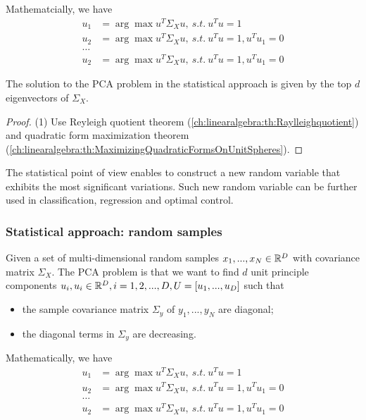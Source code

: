 \begin{refsection}
\begin{definition}
Mathematcially, we have
\begin{align*}
    u_1 &= \arg \max u^T\Sigma_X u, ~s.t.~  u^Tu = 1  \\
    u_2 &= \arg \max u^T\Sigma_X u, ~s.t.~ u^Tu=1, u^Tu_1 = 0\\
    \dots &  \\
    u_2 &= \arg \max u^T\Sigma_X u, ~s.t.~ u^Tu=1, u^Tu_1 = 0
\end{align*}
\end{definition}

\begin{theorem}
The solution to the PCA problem in the statistical approach is given by the top $d$ eigenvectors of $\Sigma_X$.
\end{theorem}
\begin{proof}
(1) Use Reyleigh quotient theorem (\autoref{ch:linearalgebra:th:Raylleighquotient}) and quadratic form maximization theorem (\autoref{ch:linearalgebra:th:MaximizingQuadraticFormsOnUnitSpheres}). 
\end{proof}


\begin{remark}[implications]
The statistical point of view enables to construct a new random variable that exhibits the most significant variations. Such new random variable can be further used in classification, regression and optimal control.
\end{remark}

\subsubsection{Statistical approach: random samples}
\begin{definition}
	Given a set of multi-dimensional random samples $x_1,...,x_N\in \mathbb{R}^D$ with covariance matrix $\Sigma_X$.  The PCA problem is that we want to find $d$ unit principle components $u_i,u_i\in \mathbb{R}^D, i=1,2,...,D, U=[u_1,...,u_D]$ such that 
	\begin{itemize}
		\item the sample covariance matrix $\Sigma_y$ of $y_1,...,y_N$ are diagonal;
		\item the diagonal terms in $\Sigma_y$ are decreasing. 
	\end{itemize}
	
	Mathematically, we have
	\begin{align*}
	u_1 &= \arg \max u^T\Sigma_X u, ~s.t.~  u^Tu = 1  \\
	u_2 &= \arg \max u^T\Sigma_X u, ~s.t.~ u^Tu=1, u^Tu_1 = 0\\
	\dots & \\
	u_2 &= \arg \max u^T\Sigma_X u, ~s.t.~ u^Tu=1, u^Tu_1 = 0
	\end{align*}
\end{definition}


\end{refsection}
